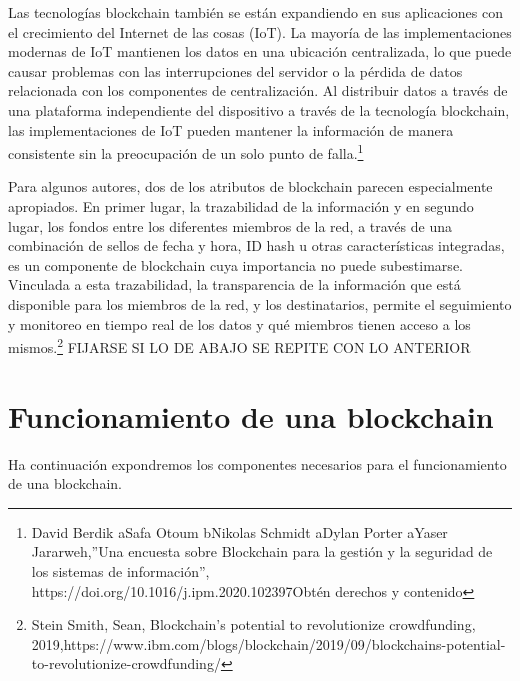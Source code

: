 \documentclass[12pt]{report} %
\begin{document}
Las tecnologías blockchain también se están expandiendo en sus aplicaciones con el crecimiento del Internet de las cosas (IoT).  La mayoría de las implementaciones modernas de IoT mantienen los datos en una ubicación centralizada, lo que puede causar problemas con las interrupciones del servidor o la pérdida de datos relacionada con los componentes de centralización. Al distribuir datos a través de una plataforma independiente del dispositivo a través de la tecnología blockchain, las implementaciones de IoT pueden mantener la información de manera consistente sin la preocupación de un solo punto de falla.\footnote{David Berdik aSafa Otoum bNikolas Schmidt aDylan Porter aYaser Jararweh,”Una encuesta sobre Blockchain para la gestión y la seguridad de los sistemas de información”, https://doi.org/10.1016/j.ipm.2020.102397Obtén derechos y contenido} 

Para algunos autores, dos de los atributos de blockchain parecen especialmente apropiados. En primer lugar, la trazabilidad de la información y en segundo lugar, los fondos entre los diferentes miembros de la red, a través de una combinación de sellos de fecha y hora, ID hash u otras características integradas, es un componente de blockchain cuya importancia no puede subestimarse. Vinculada a esta trazabilidad, la transparencia de la información que está disponible para los miembros de la red, y los destinatarios, permite el seguimiento y monitoreo en tiempo real de los datos y qué miembros tienen acceso a los mismos.\footnote{Stein Smith, Sean, Blockchain’s potential to revolutionize crowdfunding, 2019,https://www.ibm.com/blogs/blockchain/2019/09/blockchains-potential-to-revolutionize-crowdfunding/}  
FIJARSE SI LO DE ABAJO SE REPITE CON LO ANTERIOR

\section{Funcionamiento de una blockchain}

Ha continuación expondremos los componentes necesarios para el funcionamiento de una blockchain.
\end{document}
